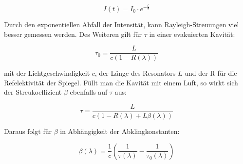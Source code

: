 \begin{equation}
I(t)=I_0 \cdot e^{-\frac{t}{\tau}}
\end{equation}

Durch den exponentiellen Abfall der Intensität, kann Rayleigh-Streuungen viel besser gemessen werden. Des Weiteren gilt für $\tau$ in einer evakuierten Kavität:

\begin{equation}
\tau_{0}=\frac{L}{c(1-R(\lambda))}
\end{equation}

mit der Lichtgeschwindigkeit $c$, der Länge des Resonators $L$ und der R für die Refelektivität der Spiegel. Füllt man die Kavität mit einem Luft, so wirkt sich der Streukoeffizient $\beta$ ebenfalls auf $\tau$ aus:

\begin{equation}
\tau= \frac{L}{c(1-R(\lambda)+L\beta(\lambda))}
\end{equation}

Daraus folgt für $\beta$ in Abhängigkeit der Abklingkonstanten:

\begin{equation}
\beta(\lambda)=\frac{1}{c}\left(\frac{1}{\tau(\lambda)}-\frac{1}{\tau_0(\lambda)}\right)
\end{equation}
